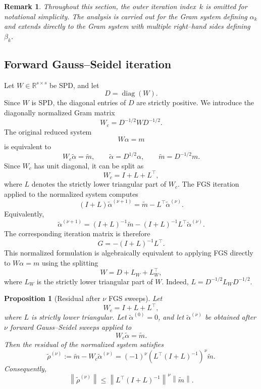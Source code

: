\documentclass[pdflatex,sn-mathphys-num]{sn-jnl}%
\newtheorem{proposition}{Proposition}
\newtheorem{remark}{Remark}
\begin{document}
\begin{remark}
Throughout this section, the outer iteration index~$k$ is omitted for notational simplicity. The analysis is carried out for the Gram system defining $\alpha_k$ and extends directly to the Gram system with multiple right--hand sides defining $\beta_k$.
\end{remark}

\subsection{Forward Gauss--Seidel iteration}
\label{FGS}

Let $W\in\mathbb{R}^{s\times s}$ be SPD, and let
\[
D=\operatorname{diag}(W).
\]
Since $W$ is SPD, the diagonal entries of $D$ are strictly positive.
We introduce the diagonally normalized Gram matrix
\[
W_c=D^{-1/2}WD^{-1/2}.
\]
The original reduced system
\[
W\alpha=m
\]
is equivalent to
\[
W_c\widetilde{\alpha}=\widetilde{m},
\qquad
\widetilde{\alpha}=D^{1/2}\alpha,
\qquad
\widetilde{m}=D^{-1/2}m.
\]
Since $W_c$ has unit diagonal, it can be split as
\[
W_c=I+L+L^\top,
\]
where $L$ denotes the strictly lower triangular part of $W_c$.
The FGS iteration applied to the normalized system computes
\begin{equation}
\label{eq:fgs-iteration}
(I+L)\widetilde{\alpha}^{(\nu+1)}
=
\widetilde{m}-L^\top\widetilde{\alpha}^{(\nu)}.
\end{equation}
Equivalently,
\[
\widetilde{\alpha}^{(\nu+1)}
=
(I+L)^{-1}\widetilde{m}
-
(I+L)^{-1}L^\top\widetilde{\alpha}^{(\nu)}.
\]
The corresponding iteration matrix is therefore
\[
G=-(I+L)^{-1}L^\top.
\]
This normalized formulation is algebraically equivalent to applying
FGS directly to $W\alpha=m$ using the splitting
\[
W=D+L_W+L_W^\top,
\]
where $L_W$ is the strictly lower triangular part of $W$. Indeed,
$L=D^{-1/2}L_WD^{-1/2}$.
\begin{proposition}[Residual after $\nu$ FGS sweeps]
\label{prop:fgs-residual}
Let
\[
W_c=I+L+L^\top,
\]
where $L$ is strictly lower triangular. Let
$\widetilde{\alpha}^{(0)}=0$, and let
$\widetilde{\alpha}^{(\nu)}$ be obtained after $\nu$ forward
Gauss--Seidel sweeps applied to
\[
W_c\widetilde{\alpha}=\widetilde{m}.
\]
Then the residual of the normalized system satisfies
\begin{equation}
\label{eq:fgs-residual-formula}
\widetilde{\rho}^{(\nu)}
:=
\widetilde{m}
-
W_c\widetilde{\alpha}^{(\nu)}
=
(-1)^\nu
\left(
L^\top(I+L)^{-1}
\right)^\nu
\widetilde{m}.
\end{equation}
Consequently,
\begin{equation}
\label{eq:fgs-residual-bound}
\left\|
\widetilde{\rho}^{(\nu)}
\right\|
\leq
\left\|
L^\top(I+L)^{-1}
\right\|^\nu
\left\|
\widetilde{m}
\right\|.
\end{equation}
\end{proposition}
\end{document}
